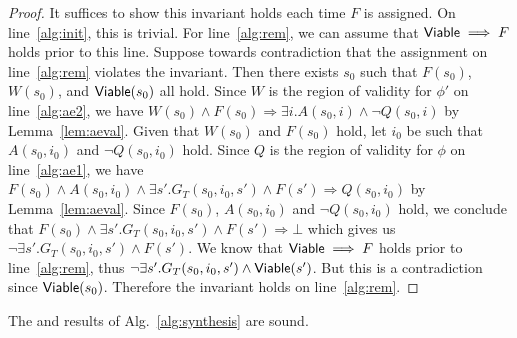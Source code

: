 \begin{proof}
  It suffices to show this invariant holds each time $F$ is assigned.
  On line~\ref{alg:init}, this is trivial. For line~\ref{alg:rem}, we can assume that
  ${\mathsf {Viable}} \implies F$ holds prior to this line. Suppose towards
  contradiction that the assignment on line~\ref{alg:rem} violates the invariant.
  Then there exists $s_0$ such that $F(s_0)$, $W(s_0)$, and
  ${\mathsf {Viable}}(s_0)$ all hold. Since $W$ is the region of validity for
  $\phi'$ on line~\ref{alg:ae2}, we have
  $W(s_0) \land F(s_0) \Rightarrow \exists i. A(s_0, i) \land \neg Q(s_0, i)$
  by Lemma~\ref{lem:aeval}. Given that $W(s_0)$ and $F(s_0)$ hold, let $i_0$
  be such that $A(s_0, i_0)$ and $\neg Q(s_0, i_0)$ hold. Since $Q$ is the
  region of validity for $\phi$ on line~\ref{alg:ae1}, we have
  $F(s_0) \land A(s_0, i_0) \land \exists s'. G_T(s_0, i_0, s') \land F(s') \Rightarrow Q(s_0, i_0)$
  by Lemma~\ref{lem:aeval}.
  Since $F(s_0)$, $A(s_0, i_0)$ and $\neg Q(s_0, i_0)$ hold, we conclude that
  $F(s_0) \land \exists s'. G_T(s_0, i_0, s') \land F(s') \Rightarrow \bot$ which
  gives us $\neg \exists s'. G_T(s_0, i_0, s') \land F(s')$.
  We know that
  ${\mathsf {Viable}} \implies F$ holds prior to line~\ref{alg:rem}, thus
  $\neg \exists s'. G_T(s_0, i_0, s') \land {\mathsf {Viable}}(s')$. But this is a
  contradiction since ${\mathsf {Viable}}(s_0)$. Therefore the invariant holds on
  line~\ref{alg:rem}.
\end{proof}


\begin{theorem}
  The \realizable and \unrealizable results of
  Alg.~\ref{alg:synthesis} are sound.
\end{theorem}


